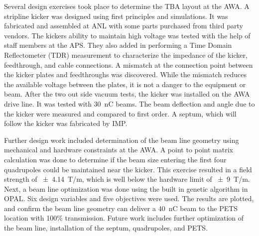 
Several design exercises took place to determine the TBA layout at the AWA. 
A stripline kicker was designed using first principles and simulations. 
It was fabricated and assembled at ANL with some parts purchased from third party vendors.
The kickers ability to maintain high voltage was tested with the help of staff members at the APS.
They also added in performing a Time Domain Reflectometer (TDR) measurement to characterize 
the impedance of the kicker, feedthrough, and cable connections. 
A mismatch at the connection point between the kicker plates and feedthroughs was discovered.
While the mismatch reduces the available voltage between the plates, it is not a danger to 
the equipment or beam. After the two out side vacuum tests, the kicker was installed on 
the AWA drive line. It was tested with \SI{30}{nC} beams. 
The beam deflection and angle due to the kicker were measured and 
compared to first order. 
A septum, which will follow the kicker was fabricated by IMP.

Further design work included determination of the beam line geometry
using mechanical and hardware constraints at the AWA. 
A point to point matrix calculation was done to determine if the 
beam size entering the first four quadrupoles could be maintained near the kicker.
This exercise resulted in a field strength of \SI{\pm 4.14}{T/m}, 
which is well below the hardware limit of \SI{\pm9}{T/m}. 
Next, a beam line optimization was done using the built in genetic algorithm in OPAL.  
Six design variables and five objectives were used. 
The results are plotted, and confirm the beam line geometry can deliver 
a \SI{40}{nC} beam to the PETS location with 100\% transmission.
Future work includes further optimization of the beam line, 
installation of the septum, quadrupoles, and PETS.


 












